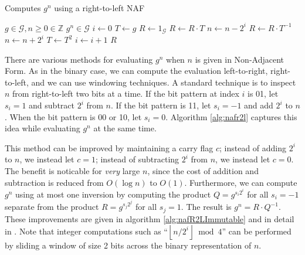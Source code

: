 \documentclass{ucalgthes1}
\theoremstyle{plain}
\theoremstyle{definition}
\newcommand{\ZZ}{\mathbb{Z}}
\newcommand{\floor}[1]{\left\lfloor #1 \right\rfloor}
\begin{document}
\begin{algorithm}[h]
\caption{Computes $g^n$ using a right-to-left NAF}\label{alg:nafr2l}
\begin{algorithmic}[1]
\REQUIRE $g \in \mathcal G, n \ge 0 \in \ZZ$
\ENSURE $g^n \in \mathcal G$
\STATE $i \gets 0$
\STATE $T \gets g$ 
\STATE $R \gets 1_{\mathcal G}$
	\IF {$\floor{n/2^i} \equiv 1 \pmod 4$}
		\STATE $R \gets R \cdot T$
		\STATE $n \gets n-2^i$
	\ELSIF {$\floor{n/2^i} \equiv 3 \pmod 4$}
		\STATE $R \gets R \cdot T^{-1}$
		\STATE $n \gets n+2^i$
	\ENDIF
	\STATE $T \gets T^2$
	\STATE $i \gets i + 1$
\ENDWHILE
\RETURN $R$
\end{algorithmic}
\end{algorithm}

There are various methods for evaluating $g^n$ when $n$ is given in Non-Adjacent Form.  As in the binary case, we can compute the evaluation left-to-right, right-to-left, and we can use windowing techniques.  A standard technique is to inspect $n$ from right-to-left two bits at a time.  If the bit pattern at index $i$ is 01, let $s_i = 1$ and subtract $2^i$ from $n$.  If the bit pattern is 11, let $s_i = -1$ and add $2^i$ to $n$.  When the bit pattern is 00 or 10, let $s_i =0$.  Algorithm \ref{alg:nafr2l} captures this idea while evaluating $g^n$ at the same time.

This method can be improved by maintaining a carry flag $c$; instead of adding $2^i$ to $n$, we instead let $c = 1$; instead of subtracting $2^i$ from $n$, we instead let $c = 0$.  The benefit is noticable for \emph{very} large $n$, since the cost of addition and subtraction is reduced from $O(\log n)$ to $O(1)$.  Furthermore, we can compute $g^n$ using at most one inversion by computing the product $Q = g^{s_i2^i}$ for all $s_i = -1$ separate from the product $R = g^{s_j2^j}$ for all $s_j = 1$.  The result is $g^n = R \cdot Q^{-1}$.  These improvements are given in algorithm \ref{alg:nafR2LImmutable} and in detail in \cite[p.4]{Joye2000}.  Note that integer computations such as ``$\floor{n/2^i} \bmod 4$'' can be performed by sliding a window of size 2 bits across the binary representation of $n$.
\end{document}
